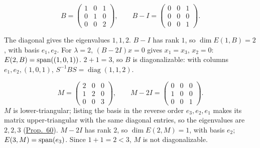 \documentclass[10pt]{scrartcl}
\begin{document}
\begin{example*}
  \[ B=\begin{pmatrix}1&0&1\\0&1&0\\0&0&2\end{pmatrix},\qquad B-I=\begin{pmatrix}0&0&1\\0&0&0\\0&0&1\end{pmatrix}. \]
  \begin{steps}
    \ii The diagonal gives the eigenvalues $1,1,2$.
    \ii $B-I$ has rank $1$, so $\dim E(1,B)=2$, with basis $e_1,e_2$. For $\lambda=2$, $(B-2I)x=0$ gives $x_1=x_3$, $x_2=0$: $E(2,B)=\operatorname{span}((1,0,1))$.
    \ii $2+1=3$, so $B$ is diagonalizable: with columns $e_1,e_2,(1,0,1)$, $S^{-1}BS=\operatorname{diag}(1,1,2)$.
  \end{steps}
\end{example*}

\begin{example*}
  \[ M=\begin{pmatrix}2&0&0\\1&2&0\\0&0&3\end{pmatrix},\qquad M-2I=\begin{pmatrix}0&0&0\\1&0&0\\0&0&1\end{pmatrix}. \]
  $M$ is lower-triangular; listing the basis in the reverse order $e_3,e_2,e_1$ makes its matrix upper-triangular with the same diagonal entries, so the eigenvalues are $2,2,3$ (\hyperref[prop-60]{Prop.~60}). $M-2I$ has rank $2$, so $\dim E(2,M)=1$, with basis $e_2$; $E(3,M)=\operatorname{span}(e_3)$. Since $1+1=2<3$, $M$ is not diagonalizable.
\end{example*}
\end{document}
